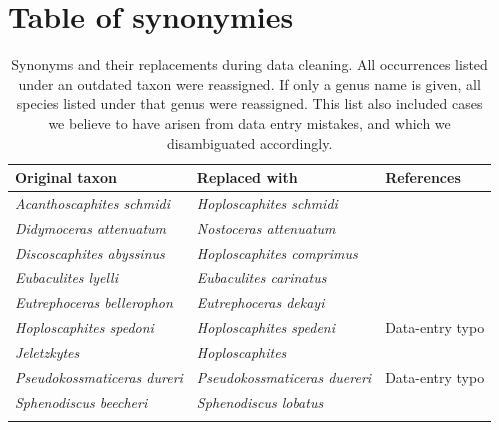 \documentclass[a4paper]{article}
\begin{document}
\printbibliography

\appendix 

\makeatletter
\renewcommand \thesection{S\@arabic\c@section}
\renewcommand\thetable{S\@arabic\c@table}
\renewcommand \thefigure{S\@arabic\c@figure}
\makeatother

\section*{Table of synonymies}


\begin{table}[H]
\centering
\begin{tabular}{lll}
Original taxon  & Replaced with	& References	 \\
\hline
\textit{Acanthoscaphites schmidi} & \textit{Hoploscaphites schmidi} & \cite{machalskiLateMaastrichtianEarliest2005}\\
\textit{Didymoceras attenuatum} & \textit{Nostoceras attenuatum} & \cite{kuchlerUpperCampanianMaastrichtianAmmonites2001}\\
\textit{Discoscaphites abyssinus} & \textit{Hoploscaphites comprimus} & \cite{landmanScaphitidAmmonitesUpper1993}\\
\textit{Eubaculites lyelli} & \textit{Eubaculites carinatus} & \cite{wardMaastrichtianAmmonitesBiscay1993}\\
\textit{Eutrephoceras bellerophon} & \textit{Eutrephoceras dekayi} & \cite{malchykLateCretaceousEarly}\\ 
\textit{Hoploscaphites spedoni} & \textit{Hoploscaphites spedeni} & Data-entry typo\\
\textit{Jeletzkytes} & \textit{Hoploscaphites} & \cite{landmanScaphitesNodosusGroup2010}\\
\textit{Pseudokossmaticeras dureri} & \textit{Pseudokossmaticeras duereri} & Data-entry typo\\
\textit{Sphenodiscus beecheri} & \textit{Sphenodiscus lobatus} & \cite{kennedy1997new}\\
\hline \\
\end{tabular}
\caption{Synonyms and their replacements during data cleaning. All occurrences listed under an outdated taxon were reassigned. If only a genus name is given, all species listed under that genus were reassigned. This list also included cases we believe to have arisen from data entry mistakes, and which we disambiguated accordingly.}
\label{tab_synonymies}
\end{table}
\end{document}
